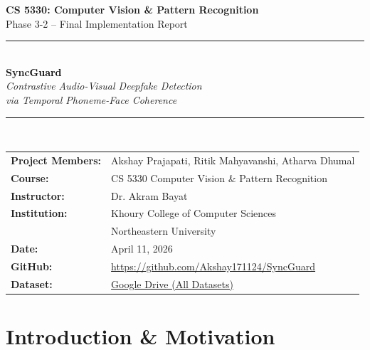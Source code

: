 \documentclass[12pt, letterpaper]{article}
\begin{document}

\begin{titlepage}
  \centering
  \vspace*{1.8cm}

  {\LARGE \textbf{CS 5330: Computer Vision \& Pattern Recognition}}\\[0.4cm]
  {\large Phase 3-2 -- Final Implementation Report}\\[1.4cm]

  \noindent\rule{\linewidth}{1.5pt}\\[0.5cm]
  {\Huge \textbf{\textcolor{accent}{Sync}\textcolor{black}{Guard}}}\\[0.4cm]
  {\Large \textit{Contrastive Audio-Visual Deepfake Detection\\[0.2cm]
  via Temporal Phoneme-Face Coherence}}\\[0.5cm]
  \noindent\rule{\linewidth}{1.5pt}\\[1.8cm]

  \begin{tabular}{ll}
    \textbf{Project Members:} & Akshay Prajapati, Ritik Mahyavanshi, Atharva Dhumal \\[0.4cm]
    \textbf{Course:}          & CS 5330 Computer Vision \& Pattern Recognition \\[0.4cm]
    \textbf{Instructor:}      & Dr. Akram Bayat \\[0.4cm]
    \textbf{Institution:}     & Khoury College of Computer Sciences \\
                              & Northeastern University \\[0.4cm]
    \textbf{Date:}            & April 11, 2026 \\[0.4cm]
    \textbf{GitHub:}          & \url{https://github.com/Akshay171124/SyncGuard} \\[0.4cm]
    \textbf{Dataset:}         & \href{https://drive.google.com/drive/folders/1wQ9cdWo5R9O8ZvwPO7XUnfMvVOgoIF1E}{Google Drive (All Datasets)} \\
  \end{tabular}

  \vfill
\end{titlepage}

\tableofcontents
\newpage

\section{Introduction \& Motivation}
\end{document}
